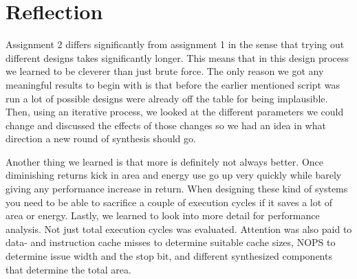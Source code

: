 \section{Reflection}
Assignment 2 differs significantly from assignment 1 in the sense that trying out different designs takes significantly longer. This means that in this design process we learned to be cleverer than just brute force. The only reason we got any meaningful results to begin with is that before the earlier mentioned script was run a lot of possible designs were already off the table for being implausible. Then, using an iterative process, we looked at the different parameters we could change and discussed the effects of those changes so we had an idea in what direction a new round of synthesis should go.

Another thing we learned is that more is definitely not always better. Once diminishing returns kick in area and energy use go up very quickly while barely giving any performance increase in return. When designing these kind of systems you need to be able to sacrifice a couple of execution cycles if it saves a lot of area or energy. Lastly, we learned to look into more detail for performance analysis. Not just total execution cycles was evaluated. Attention was also paid to data- and instruction cache misses to determine suitable cache sizes, NOPS to determine issue width and the stop bit, and different synthesized components that determine the total area.